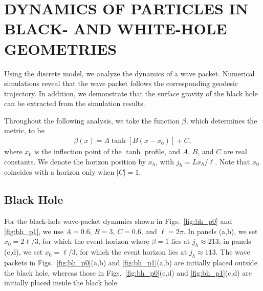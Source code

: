 \documentclass[reprint,amsmath,amssymb,aps,prb,showkeys]{revtex4-2}
\begin{document}
\section{DYNAMICS OF PARTICLES IN BLACK- AND WHITE-HOLE GEOMETRIES}
\label{sec:dynamics}
Using the discrete model, we analyze the dynamics of a wave packet. Numerical simulations reveal that the wave packet follows the corresponding geodesic trajectory. In addition, we demonstrate that the surface gravity of the black hole can be extracted from the simulation results.

Throughout the following analysis, we take the function $\beta$, which determines the metric, to be
\begin{align}
\beta(x) = A\tanh\left[B(x-x_0)\right] + C,
\end{align}
where $x_0$ is the inflection point of the $\tanh$ profile, and $A$, $B$, and $C$ are real constants. We denote the horizon position by $x_h$, with $j_h=Lx_h/\ell$.
Note that $x_0$ coincides with a horizon only when $|C|=1$.

\subsection{Black Hole}
For the black-hole wave-packet dynamics shown in Figs.~\ref{fig:bh_p0} and \ref{fig:bh_p1}, we use $A=0.6$, $B=3$, $C=0.6$, and $\ell=2\pi$. In panels (a,b), we set $x_0=2\ell/3$, for which the event horizon where $\beta=1$ lies at $j_h\approx213$; in panels (c,d), we set $x_0=\ell/3$, for which the event horizon lies at $j_h\approx113$. The wave packets in Figs.~\ref{fig:bh_p0}(a,b) and \ref{fig:bh_p1}(a,b) are initially placed outside the black hole, whereas those in Figs.~\ref{fig:bh_p0}(c,d) and \ref{fig:bh_p1}(c,d) are initially placed inside the black hole.
\end{document}

